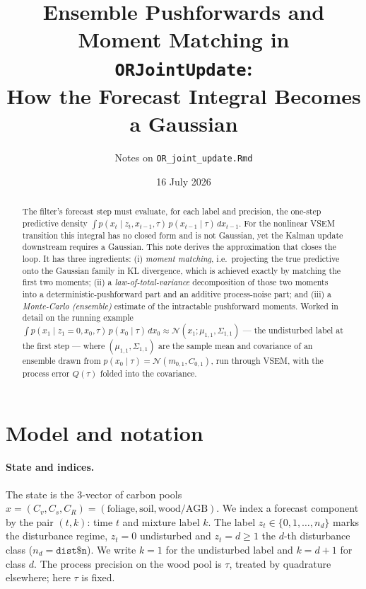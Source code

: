 \documentclass[11pt]{article}
\title{Ensemble Pushforwards and Moment Matching in \texttt{ORJointUpdate}:\\
How the Forecast Integral Becomes a Gaussian}
\author{Notes on \texttt{OR\_joint\_update.Rmd}}
\date{16 July 2026}
\newcommand{\code}[1]{\texttt{#1}}
\newcommand{\Norm}{\mathcal{N}}
\begin{document}
\maketitle

\begin{abstract}
The filter's forecast step must evaluate, for each label and precision, the one-step
predictive density $\int p(x_t\mid z_t,x_{t-1},\tau)\,p(x_{t-1}\mid\tau)\,dx_{t-1}$. For
the nonlinear VSEM transition this integral has no closed form and is not Gaussian, yet
the Kalman update downstream requires a Gaussian. This note derives the approximation
that closes the loop. It has three ingredients: (i) \emph{moment matching}, i.e.\
projecting the true predictive onto the Gaussian family in KL divergence, which is
achieved exactly by matching the first two moments; (ii) a \emph{law-of-total-variance}
decomposition of those two moments into a deterministic-pushforward part and an additive
process-noise part; and (iii) a \emph{Monte-Carlo (ensemble)} estimate of the intractable
pushforward moments. Worked in detail on the running example
$\int p(x_1\mid z_1{=}0,x_0,\tau)\,p(x_0\mid\tau)\,dx_0\approx\Norm(x_1;\mu_{1,1},\Sigma_{1,1})$
--- the undisturbed label at the first step --- where $(\mu_{1,1},\Sigma_{1,1})$ are the
sample mean and covariance of an ensemble drawn from $p(x_0\mid\tau)=\Norm(m_{0,1},C_{0,1})$,
run through VSEM, with the process error $Q(\tau)$ folded into the covariance.
\end{abstract}

\tableofcontents

\section{Model and notation}
\label{sec:setup}

\paragraph{State and indices.} The state is the $3$-vector of carbon pools
$x=(C_v,C_s,C_R)=(\text{foliage},\text{soil},\text{wood/AGB})$. We index a forecast
component by the pair $(t,k)$: time $t$ and mixture label $k$. The label
$z_t\in\{0,1,\dots,n_d\}$ marks the disturbance regime, $z_t=0$ undisturbed and
$z_t=d\ge1$ the $d$-th disturbance class ($n_d=\code{dist\$n}$). We write $k=1$ for the
undisturbed label and $k=d+1$ for class $d$. The process precision on the wood pool is
$\tau$, treated by quadrature elsewhere; here $\tau$ is fixed.
\end{document}
